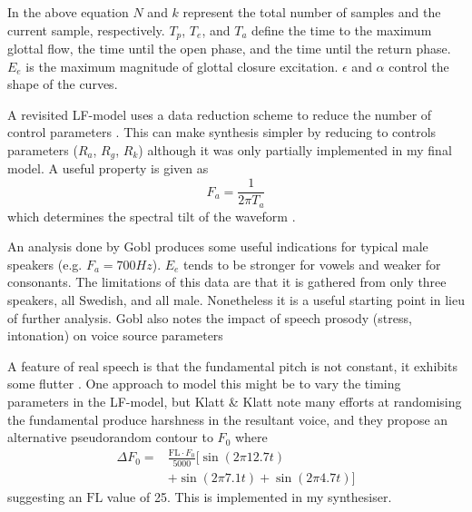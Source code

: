 In the above equation $N$ and $k$ represent the total number of samples and the current sample, respectively. $T_p$, $T_e$, and $T_a$ define the time to the maximum glottal flow, the time until the open phase, and the time until the return phase. $E_e$ is the maximum magnitude of glottal closure excitation. $\epsilon$ and $\alpha$ control the shape of the curves.

A revisited LF-model uses a data reduction scheme to reduce the number of control parameters \cite{Fant1995}. This can make synthesis simpler by reducing to controls parameters ($R_a$, $R_g$, $R_k$) although it was only partially implemented in my final model. A useful property is given as
%
\begin{equation}
	F_a = \dfrac{1}{2\pi T_a}
\end{equation}
%
which determines the spectral tilt of the waveform \cite{Fant1995}. 

An analysis done by Gobl \cite{Gobl1988} produces some useful indications for typical male speakers (e.g. $F_a = \si{700 Hz}$). $E_e$ tends to be stronger for vowels and weaker for consonants. The limitations of this data are that it is gathered from only three speakers, all Swedish, and all male. Nonetheless it is a useful starting point in lieu of further analysis. Gobl also notes the impact of speech prosody (stress, intonation) on voice source parameters 

A feature of real speech is that the fundamental pitch is not constant, it exhibits some flutter \cite{Klatt1990}. One approach to model this might be to vary the timing parameters in the LF-model, but Klatt \& Klatt note \cite{Klatt1990} many efforts at randomising the fundamental produce harshness in the resultant voice, and they propose an alternative pseudorandom contour to $F_0$ where
%
\begin{equation} \label{eq:flutter}
	\begin{aligned}
		\Delta F_0  = & \frac{\textrm{FL} \cdot F_0}{5000} \big[\sin(2 \pi 12.7t) \\ 
		& + \sin(2 \pi 7.1t) + \sin(2 \pi 4.7t)\big]
	\end{aligned}
\end{equation}
%
suggesting an $\textrm{FL}$ value of 25. This is implemented in my synthesiser.
